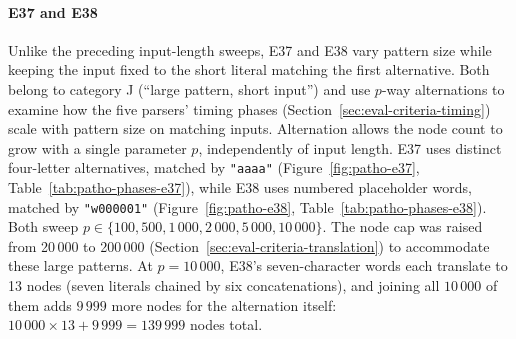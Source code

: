 \paragraph{E37 and E38}
Unlike the preceding input-length sweeps, E37 and E38
vary pattern size while keeping the input fixed
to the short literal matching the first alternative.
Both belong to category J (``large pattern, short input'')
and use $p$-way alternations to examine how
the five parsers' timing phases
(Section~\ref{sec:eval-criteria-timing})
scale with pattern size on matching inputs.
Alternation allows the node count to grow with
a single parameter $p$, independently of input length.
E37 uses distinct four-letter alternatives,
matched by \texttt{"aaaa"}
(Figure~\ref{fig:patho-e37},
Table~\ref{tab:patho-phases-e37}),
while E38 uses numbered placeholder words,
matched by \texttt{"w000001"}
(Figure~\ref{fig:patho-e38},
Table~\ref{tab:patho-phases-e38}).
Both sweep $p \in \{100, 500, 1\,000,
2\,000, 5\,000, 10\,000\}$.
The node cap was raised from 20\,000 to
200\,000 (Section~\ref{sec:eval-criteria-translation})
to accommodate these large patterns.
At $p = 10\,000$, E38's seven-character words each translate to 13 nodes
(seven literals chained by six concatenations), and joining all
$10\,000$ of them adds $9\,999$ more nodes for the alternation itself:
$10\,000 \times 13 + 9\,999 = 139\,999$ nodes total.

%
%
%

